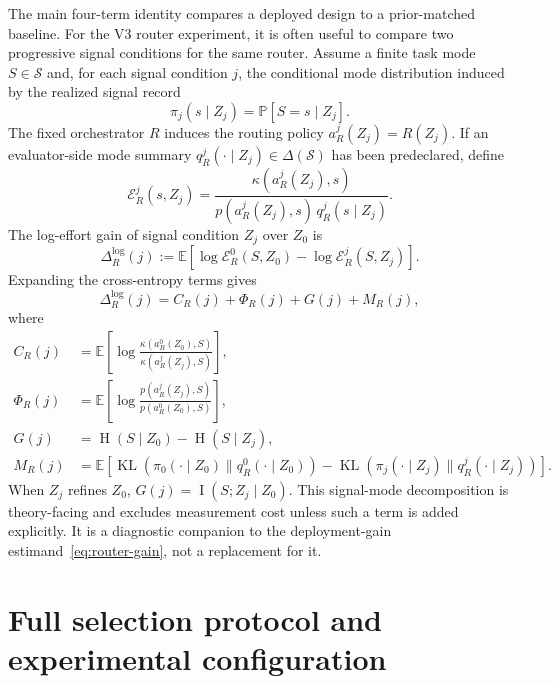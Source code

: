 \documentclass{article}
\DeclareMathOperator{\KL}{KL}
\DeclareMathOperator{\MI}{I}
\DeclareMathOperator{\Hent}{H}
\newcommand{\cS}{\mathcal{S}}
\newcommand{\E}{\mathbb{E}}
\newcommand{\Prb}{\mathbb{P}}
\begin{document}
The main four-term identity compares a deployed design to a prior-matched baseline.
For the V3 router experiment, it is often useful to compare two progressive signal conditions for the same router.
Assume a finite task mode $S\in\cS$ and, for each signal condition $j$, the conditional mode distribution induced by the realized signal record
\[
\pi_j(s\mid Z_j)=\Prb[S=s\mid Z_j].
\]
The fixed orchestrator $R$ induces the routing policy $a_R^j(Z_j)=R(Z_j)$.
If an evaluator-side mode summary $q_R^j(\cdot\mid Z_j)\in\Delta(\cS)$ has been predeclared, define
\[
\mathcal E_R^j(s,Z_j)
=
\frac{\kappa(a_R^j(Z_j),s)}
{p(a_R^j(Z_j),s)\,q_R^j(s\mid Z_j)} .
\]
The log-effort gain of signal condition $Z_j$ over $Z_0$ is
\[
\Delta_R^{\log}(j)
:=
\E[
\log \mathcal E_R^0(S,Z_0)-\log \mathcal E_R^j(S,Z_j)
].
\]
Expanding the cross-entropy terms gives
\[
\Delta_R^{\log}(j)
=
C_R(j)+\Phi_R(j)+G(j)+M_R(j),
\]
where
\begin{align*}
C_R(j)
&=
\E\!\left[
\log\frac{\kappa(a_R^0(Z_0),S)}{\kappa(a_R^j(Z_j),S)}
\right],
\\
\Phi_R(j)
&=
\E\!\left[
\log\frac{p(a_R^j(Z_j),S)}{p(a_R^0(Z_0),S)}
\right],
\\
G(j)
&=
\Hent(S\mid Z_0)-\Hent(S\mid Z_j),
\\
M_R(j)
&=
\E\!\left[
\KL(\pi_0(\cdot\mid Z_0)\|q_R^0(\cdot\mid Z_0))
-
\KL(\pi_j(\cdot\mid Z_j)\|q_R^j(\cdot\mid Z_j))
\right].
\end{align*}
When $Z_j$ refines $Z_0$, $G(j)=\MI(S;Z_j\mid Z_0)$.
This signal-mode decomposition is theory-facing and excludes measurement cost unless such a term is added explicitly.
It is a diagnostic companion to the deployment-gain estimand~\eqref{eq:router-gain}, not a replacement for it.

\section{Full selection protocol and experimental configuration}
\label{app:experiment-details}
\end{document}
